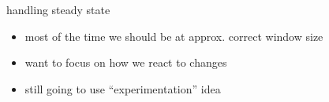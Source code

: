 \begin{frame}{handling steady state}
    \begin{itemize}
    \item most of the time we should be at approx. correct window size
    \vspace{.5cm}
    \item want to focus on how we react to changes
    \item still going to use ``experimentation'' idea
    \end{itemize}
\end{frame}
